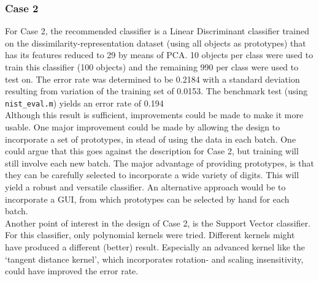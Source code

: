 \subsubsection*{Case 2}
For Case 2, the recommended classifier is a Linear Discriminant classifier trained on the dissimilarity-representation dataset (using all objects as prototypes) that has its features reduced to 29 by means of PCA. 10 objects per class were used to train this classifier (100 objects) and the remaining 990 per class were used to test on. The error rate was determined to be 0.2184 with a standard deviation resulting from variation of the training set of 0.0153. The benchmark test (using \texttt{nist\_eval.m}) yields an error rate of 0.194\\
Although this result is sufficient, improvements could be made to make it more usable. One major improvement could be made by allowing the design to incorporate a set of prototypes, in stead of using the data in each batch. One could argue that this goes against the description for Case 2, but training will still involve each new batch. The major advantage of providing prototypes, is that they can be carefully selected to incorporate a wide variety of digits. This will yield a robust and versatile classifier. An alternative approach would be to incorporate a GUI, from which prototypes can be selected by hand for each batch. \\
Another point of interest in the design of Case 2, is the Support Vector classifier. For this classifier, only polynomial kernels were tried. Different kernels might have produced a different (better) result. Especially an advanced kernel like the ‘tangent distance kernel’, which incorporates rotation- and scaling insensitivity, could have improved the error rate.\\



